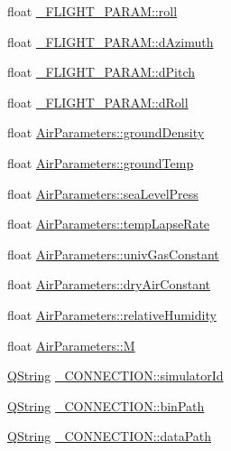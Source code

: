 \begin{DoxyCompactItemize}
\item 
float \hyperlink{group___h_i_t_l_plugin_ga1e4f51848f0c33a0264bc1fc9acb63db}{\-\_\-\-F\-L\-I\-G\-H\-T\-\_\-\-P\-A\-R\-A\-M\-::roll}
\item 
float \hyperlink{group___h_i_t_l_plugin_gaeb046a092ad0f1b208a0341f7e6fd520}{\-\_\-\-F\-L\-I\-G\-H\-T\-\_\-\-P\-A\-R\-A\-M\-::d\-Azimuth}
\item 
float \hyperlink{group___h_i_t_l_plugin_gaff13db0c35d76e6eda91b623fb0fef8b}{\-\_\-\-F\-L\-I\-G\-H\-T\-\_\-\-P\-A\-R\-A\-M\-::d\-Pitch}
\item 
float \hyperlink{group___h_i_t_l_plugin_gad9c4016b0ff06d6f0c8208ad1a94b281}{\-\_\-\-F\-L\-I\-G\-H\-T\-\_\-\-P\-A\-R\-A\-M\-::d\-Roll}
\item 
float \hyperlink{group___h_i_t_l_plugin_ga450ddae855377cbc0ce591c7703bcf3f}{\-Air\-Parameters\-::ground\-Density}
\item 
float \hyperlink{group___h_i_t_l_plugin_gab28b8a30520fdf84e924254a8e7f0167}{\-Air\-Parameters\-::ground\-Temp}
\item 
float \hyperlink{group___h_i_t_l_plugin_gad886dc623ba9dd1cb06beeb950791c7a}{\-Air\-Parameters\-::sea\-Level\-Press}
\item 
float \hyperlink{group___h_i_t_l_plugin_gae5608554d84c53cb81499d63b9381f9f}{\-Air\-Parameters\-::temp\-Lapse\-Rate}
\item 
float \hyperlink{group___h_i_t_l_plugin_gaf6cf658bcff6f341c341ba3f6194761c}{\-Air\-Parameters\-::univ\-Gas\-Constant}
\item 
float \hyperlink{group___h_i_t_l_plugin_ga343d7519080c3b70a59e554bfc2ed57d}{\-Air\-Parameters\-::dry\-Air\-Constant}
\item 
float \hyperlink{group___h_i_t_l_plugin_ga259002c03d3dec62e3af14ded35e5bfd}{\-Air\-Parameters\-::relative\-Humidity}
\item 
float \hyperlink{group___h_i_t_l_plugin_gaa24db2a922b9f638fdaacad6e3f4fb91}{\-Air\-Parameters\-::\-M}
\item 
\hyperlink{group___u_a_v_objects_plugin_gab9d252f49c333c94a72f97ce3105a32d}{\-Q\-String} \hyperlink{group___h_i_t_l_plugin_gae2769b70fdfc601ee4d7fc19c08bfe59}{\-\_\-\-C\-O\-N\-N\-E\-C\-T\-I\-O\-N\-::simulator\-Id}
\item 
\hyperlink{group___u_a_v_objects_plugin_gab9d252f49c333c94a72f97ce3105a32d}{\-Q\-String} \hyperlink{group___h_i_t_l_plugin_ga7bd6d35f193af2ec2365db4a4faaf7e7}{\-\_\-\-C\-O\-N\-N\-E\-C\-T\-I\-O\-N\-::bin\-Path}
\item 
\hyperlink{group___u_a_v_objects_plugin_gab9d252f49c333c94a72f97ce3105a32d}{\-Q\-String} \hyperlink{group___h_i_t_l_plugin_ga4505c573ba399fc3e915fec6842c3bcb}{\-\_\-\-C\-O\-N\-N\-E\-C\-T\-I\-O\-N\-::data\-Path}

\end{DoxyCompactItemize}
